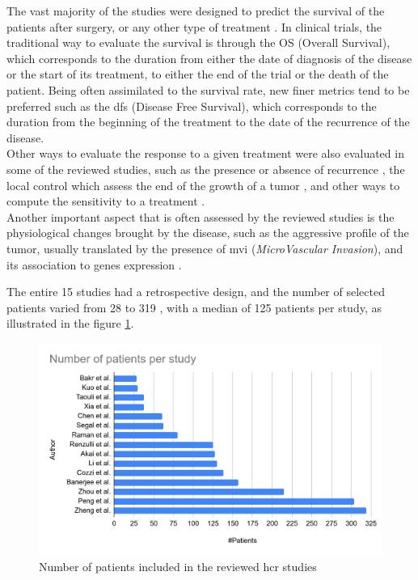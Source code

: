 The vast majority of the studies were designed to predict the survival
of the patients after surgery, or any other type of treatment 
\cite{Cozzi2017,Akai2018,Chen2017,Li2016,Banerjee2015,Segal2007,Zheng2018,Xia2018}. In
clinical trials, the traditional way to evaluate the survival is through
the OS (Overall Survival), which corresponds to the duration from either
the date of diagnosis of the disease or the start of its treatment, to
either the end of the trial or the death of the patient. Being often
assimilated to the survival rate, new finer metrics tend to be preferred
such as the \ac{dfs} (Disease Free Survival), which corresponds to the
duration from the beginning of the treatment to the date of the
recurrence of the disease.\\
Other ways to evaluate the response to a given treatment were also
evaluated in some of the reviewed studies, such as the presence or
absence of recurrence \cite{Zhou2017a,Zheng2018}, the local control
which assess the end of the growth of a tumor \cite{Cozzi2017},
and other ways to compute the sensitivity to a treatment \cite{Kuo2007,Li2016}.\\
Another important aspect that is often assessed by the reviewed studies
is the physiological changes brought by the disease, such as the
aggressive profile of the tumor, usually translated by the presence of
\ac{mvi} (\emph{MicroVascular Invasion}), and its association to genes
expression \cite{Kuo2007,Banerjee2015,Renzulli2016,Segal2007,Peng2018,Bakr2017,Taouli2017}.

The entire 15 studies had a retrospective design, and the number of
selected patients varied from 28 \cite{Bakr2017} to 319
\cite{Zheng2018}, with a median of 125 patients per study, 
as illustrated in the figure \ref{HCR_studies_number_of_patients}.


\begin{figure}[th!]
	\centering
	\includegraphics[width=0.7\linewidth]{images/image2}
	\caption{Number of patients included in the reviewed \ac{hcr} studies}
	\label{HCR_studies_number_of_patients}
\end{figure}



